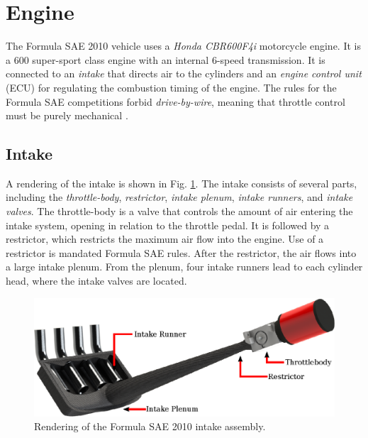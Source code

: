 \section{Engine}


The Formula SAE 2010 vehicle uses a \emph{Honda CBR600F4i} motorcycle engine. It is a \unit{600}{\centi\cubic\metre} super-sport class engine with an internal 6-speed transmission. It is connected to an \emph{intake} that directs air to the cylinders and an \emph{engine control unit} (ECU) for regulating the combustion timing of the engine. The rules for the Formula SAE competitions forbid \emph{drive-by-wire}, meaning that throttle control must be purely mechanical \cite{2010fsaerules}.

\subsection{Intake}
\label{sec:background_intake}

A rendering of the intake is shown in Fig. \ref{fig:background_intake_diagram}. The intake consists of several parts, including the \emph{throttle-body}, \emph{restrictor}, \emph{intake plenum}, \emph{intake runners}, and \emph{intake valves}. The throttle-body is a valve that controls the amount of air entering the intake system, opening in relation to the throttle pedal. It is followed by a restrictor, which restricts the maximum air flow into the engine. Use of a restrictor is mandated Formula SAE rules. After the restrictor, the air flows into a large intake plenum. From the plenum, four intake runners lead to each cylinder head, where the intake valves are located.

\begin{figure}[H]
\centering
\includegraphics[scale=1]{background/figures/intake_diagram.eps}
\caption{Rendering of the Formula SAE 2010 intake assembly.}
\label{fig:background_intake_diagram}
\end{figure}

